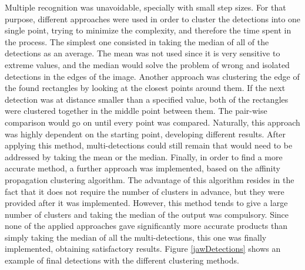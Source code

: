 \documentclass[a4paper,11pt,twoside]{article}
\begin{document}
Multiple recognition was unavoidable, specially with small step sizes. For that purpose, different approaches were used in order to cluster the detections into one single point, trying to minimize the complexity, and therefore the time spent in the process. The simplest one consisted in taking the median of all of the detections as an average. The mean was not used since it is very sensitive to extreme values, and the median would solve the problem of  wrong and isolated detections in the edges of the image. Another approach was clustering the edge of the found rectangles by looking at the closest points around them. If the next detection was at distance smaller than a specified value, both of the rectangles were clustered together in the middle point between them. The pair-wise comparison would go on until every point was compared. Naturally, this approach was highly dependent on the starting point, developing different results. After applying this method, multi-detections could still remain that would need to be addressed by taking the mean or the median. Finally, in order to find a more accurate method, a further approach was implemented, based on the affinity propagation clustering algorithm. The advantage of this algorithm resides in the fact that it does not require the number of clusters in advance, but they were provided after it was implemented. However, this method tends to give a large number of clusters and taking the median of the output was compulsory. Since none of the applied approaches gave significantly more accurate products than simply taking the median of all the multi-detections, this one was finally implemented, obtaining satisfactory results. Figure \ref{jawDetections} shows an example of final detections with the different clustering methods.
\end{document}
